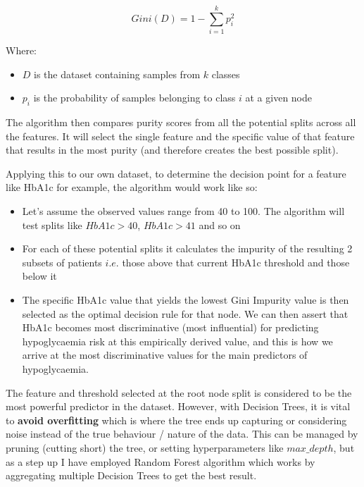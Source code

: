 	$$ Gini(D) = 1 - \sum_{i=1}^{k} p_{i}^2	$$

	\noindent Where: 
	\begin{itemize}
		\item $D$ is the dataset containing samples from $k$ classes 
		\item $p_{i}$ is the probability of samples belonging to class $i$ at a given node
	\end{itemize}
			
	\vspace{5pt}
	\noindent The algorithm then compares purity scores from all the potential splits across all the features. It will select the single feature and the specific value of that feature that results in the most purity (and therefore creates the best possible split). 

	\vspace{5pt}
	\noindent Applying this to our own dataset, to determine the decision point for a feature like HbA1c for example, the algorithm would work like so: 
	\begin{itemize}
		\item Let's assume the observed values range from 40 to 100. The algorithm will test splits like $HbA1c > 40$, $HbA1c > 41$ and so on
		\item For each of these potential splits it calculates the impurity of the resulting 2 subsets of patients $i.e.$ those above that current HbA1c threshold and those below it
		\item The specific HbA1c value that yields the lowest Gini Impurity value is then selected as the optimal decision rule for that node. We can then assert that HbA1c becomes most discriminative (most influential) for predicting hypoglycaemia risk at this empirically derived value, and this is how we arrive at the most discriminative values for the main predictors of hypoglycaemia. 
	\end{itemize}

	\vspace{5pt}
	\noindent The feature and threshold selected at the root node split is considered to be the most powerful predictor in the dataset. However, with Decision Trees, it is vital to \textbf{avoid overfitting} which is where the tree ends up capturing or considering noise instead of the true behaviour / nature of the data. This can be managed by pruning (cutting short) the tree, or setting hyperparameters like $max\_depth$, but as a step up I have employed Random Forest algorithm which works by aggregating multiple Decision Trees to get the best result.  

